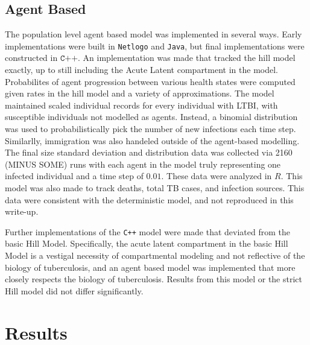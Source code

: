 \documentclass{amsart}
\begin{document}
\subsection{Agent Based}
The population level agent based model was implemented in several ways. Early
implementations were built in \texttt{Netlogo} and \texttt{Java}, but final
implementations were constructed in $\texttt{C++}$. An implementation was made
that tracked the hill model exactly, up to still including the Acute Latent
compartment in the model. Probabilites of agent progression between various
health states were computed given rates in the hill model and a variety of
approximations. The model maintained scaled individual records for every
individual with LTBI, with susceptible individuals not modelled as agents.
Instead, a binomial distribution was used to probabilistically pick the number
of new infections each time step. Similarlly, immigration was also handeled
outside of the agent-based modelling. The final size standard deviation and
distribution data was collected via 2160 (MINUS SOME) runs with each agent in
the model truly representing one infected individual and a time step of $0.01$.
These data were analyzed in $R$. This model was also made to track deaths, total
TB cases, and infection sources. This data were consistent with the
deterministic model, and not reproduced in this write-up. 

Further implementations of the \texttt{C++} model were made that deviated from
the basic Hill Model. Specifically, the acute latent compartment in the basic
Hill Model is a vestigal necessity of compartmental modeling and not reflective
of the biology of tuberculosis, and an agent based model was implemented that
more closely respects the biology of tuberculosis. Results from this model or
the strict Hill model did not differ significantly. 
\section{Results}
\end{document}
